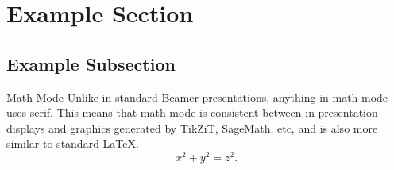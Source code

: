 \documentclass[compress]{beamer}
\begin{document}
\section{Example Section}
\subsection{Example Subsection}
\begin{frame}{Math Mode}
Unlike in standard Beamer presentations, anything in math mode uses serif. This means that math mode is consistent between in-presentation displays and graphics generated by TikZiT, SageMath, etc, and is also more similar to standard \LaTeX.
\begin{equation*}
    x^2 + y^2 = z^2.
\end{equation*}
\end{frame}
\end{document}
